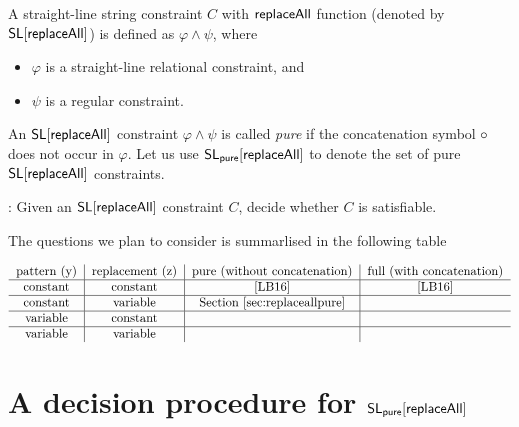 \documentclass{llncs}
\begin{document}
\begin{definition}
A straight-line string constraint $C$ with $\mathsf{replaceAll}$ function (denoted by $\mathsf{SL}[\mathsf{replaceAll}]$)  is defined as $ \varphi \wedge \psi$,  where 
\begin{itemize}
\item $\varphi$ is a straight-line relational constraint,  and
%
\item $\psi$ is a regular constraint.
%
\end{itemize}
An $\mathsf{SL}[\mathsf{replaceAll}]$ constraint $\varphi \wedge \psi$ is called \emph{pure} if the concatenation symbol $\circ$ does not occur in $\varphi$. Let us use $\mathsf{SL_{pure}}[\mathsf{replaceAll}]$ to denote the set of pure $\mathsf{SL}[\mathsf{replaceAll}]$ constraints.
\end{definition}


: Given an $\mathsf{SL}[\mathsf{replaceAll}]$ constraint $C$, decide whether $C$ is satisfiable.

The questions we plan to consider is summarlised in the following table 

\[
\begin{tabular}{c|c|c|c}
                             pattern (y)  &   replacement (z)        &   pure (without concatenation) &  full (with concatenation) \\
                              \hline
                              constant  &   constant                       & \cite{LB16}    &  \cite{LB16}   \\
 \hline
                              constant  &   variable                       &  Section \ref{sec:replaceallpure}       &    \\
 \hline
                              variable  &   constant                       &         &    \\
\hline
                              variable  &   variable                       &        &    \\
\end{tabular}
\]


\section{A decision procedure for $\mathsf{SL_{pure}}[\mathsf{replaceAll}]$} \label{sec:replaceallpure}
\end{document}
